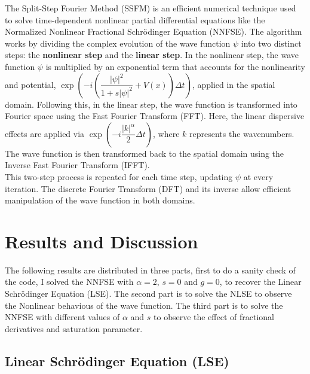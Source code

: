 \documentclass[8pt, a4paper, twocolumn]{article}
\begin{document}
The Split-Step Fourier Method (SSFM) is an efficient numerical technique used to solve time-dependent nonlinear 
partial differential equations like the Normalized Nonlinear Fractional Schrödinger Equation (NNFSE)\cite{weideman1986split}. 
The algorithm works by dividing the complex evolution of the wave function $\psi$ into two distinct steps: 
the \textbf{nonlinear step} and the \textbf{linear step}. In the nonlinear step, the wave function $\psi$ is 
multiplied by an exponential term that accounts for the nonlinearity and potential, 
$\exp\left(-i \left(\dfrac{|\psi|^2}{1 + s|\psi|^2} + V(x)\right) \Delta t\right)$, applied in the spatial 
domain. Following this, in the linear step, the wave function is transformed into Fourier space using the Fast 
Fourier Transform (FFT). Here, the linear dispersive effects are applied via 
$\exp\left(-i \dfrac{|k|^\alpha}{2} \Delta t\right)$, where $k$ represents the wavenumbers. The wave function is then 
transformed back to the spatial domain using the Inverse Fast Fourier Transform (IFFT).\\

This two-step process is repeated for each time step, updating $\psi$ at every iteration. The discrete Fourier 
Transform (DFT) and its inverse allow efficient manipulation of the wave function in both domains.

\section{Results and Discussion}

The following results are distributed in three parts, first to do a sanity check of the code, I solved the NNFSE
with $\alpha = 2$, $s = 0$ and $g = 0$, to recover the Linear Schrödinger Equation (LSE). The second part is to 
solve the NLSE to observe the Nonlinear behavious of the wave function. The third part is to solve the NNFSE
with different values of $\alpha$ and $s$ to observe the effect of fractional derivatives and saturation parameter.

\subsection{Linear Schrödinger Equation (LSE)}
\end{document}
